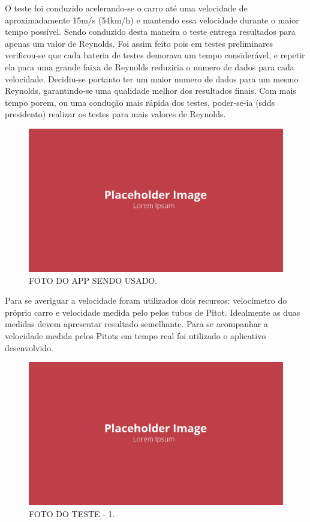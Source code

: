 O teste foi conduzido acelerando-se o carro até uma velocidade de aproximadamente 15m/s (54km/h) e mantendo essa velocidade durante o maior tempo possível. Sendo conduzido desta maneira o teste entrega resultados para apenas um valor de Reynolds. Foi assim feito pois em testes preliminares verificou-se que cada bateria de testes demorava um tempo considerável, e repetir ela para uma grande faixa de Reynolds reduziria o numero de dados para cada velocidade. Decidiu-se portanto ter um maior numero de dados para um mesmo Reynolds, garantindo-se uma qualidade melhor dos resultados finais. Com mais tempo porem, ou uma condução mais rápida dos testes, poder-se-ia (sdds presidento) realizar os testes para mais valores de Reynolds.  

\begin{figure}[!ht]
    \centering
    \includegraphics[width=.8\linewidth]{figuras/placeholder.png}
    \caption{FOTO DO APP SENDO USADO\cite{autor}.}
    \label{fig:placeholder}
\end{figure}

Para se averiguar a velocidade foram utilizados dois recursos: velocímetro do próprio carro e velocidade medida pelo pelos tubos de Pitot. Idealmente as duas medidas devem apresentar resultado semelhante. Para se acompanhar a velocidade medida pelos Pitots em tempo real foi utilizado o aplicativo desenvolvido.

\begin{figure}[!ht]
    \centering
    \includegraphics[width=.8\linewidth]{figuras/placeholder.png}
    \caption{FOTO DO TESTE - 1\cite{autor}.}
    \label{fig:placeholder}
\end{figure}

